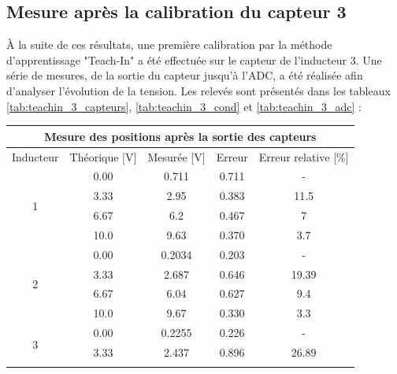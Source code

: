 \subsection{Mesure après la calibration du capteur 3}
À la suite de ces résultats, une première calibration par la méthode d'apprentissage "Teach-In" a été effectuée sur le capteur de l'inducteur 3. Une série de mesures, de la sortie du capteur jusqu'à l'ADC, a été réalisée afin d'analyser l'évolution de la tension. Les relevés sont présentés dans les tableaux \ref{tab:teachin_3_capteurs}, \ref{tab:teachin_3_cond} et \ref{tab:teachin_3_adc} :

\begin{table}[H]
    \centering
    \begin{tabular}{|c|c|c|c|c|}
        \hline
        \multicolumn{5}{|c|}{\textbf{Mesure des positions après la sortie des capteurs}}             \\ \hline
        Inducteur          & Théorique {[}V{]} & Mesurée {[}V{]} & Erreur & Erreur relative {[}\%{]} \\ \hline
        \multirow{4}{*}{1} & 0.00              & 0.711           & 0.711  & -                        \\ \cline{2-5}
                           & 3.33              & 2.95            & 0.383  & 11.5                     \\ \cline{2-5}
                           & 6.67              & 6.2             & 0.467  & 7                        \\ \cline{2-5}
                           & 10.0              & 9.63            & 0.370  & 3.7                      \\ \hline
        \multirow{4}{*}{2} & 0.00              & 0.2034          & 0.203  & -                        \\ \cline{2-5}
                           & 3.33              & 2.687           & 0.646  & 19.39                    \\ \cline{2-5}
                           & 6.67              & 6.04            & 0.627  & 9.4                      \\ \cline{2-5}
                           & 10.0              & 9.67            & 0.330  & 3.3                      \\ \hline
        \multirow{4}{*}{3} & 0.00              & 0.2255          & 0.226  & -                        \\ \cline{2-5}
                           & 3.33              & 2.437           & 0.896  & 26.89                    \\ \cline{2-5}

\end{tabular}
\end{table}
